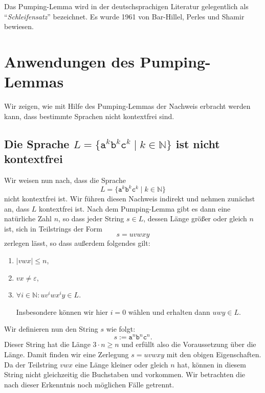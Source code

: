 \remark
Das Pumping-Lemma wird in der deutschsprachigen Literatur gelegentlich  als 
``\emph{Schleifensatz}'' bezeichnet.   Es wurde 1961 von Bar-Hillel, Perles und Shamir
\cite{barhillel:1961} bewiesen.

\section{Anwendungen des Pumping-Lemmas}
Wir zeigen, wie mit Hilfe des Pumping-Lemmas der Nachweis erbracht werden kann, dass
bestimmte Sprachen nicht kontextfrei sind.

\subsection{Die Sprache $L = \{ \mathtt{a}^k \mathtt{b}^k \mathtt{c}^k \mid k \in \mathbb{N} \}$ ist
nicht kontextfrei}
Wir weisen nun nach, dass die Sprache
\[ L = \{ \mathtt{a}^k \mathtt{b}^k \mathtt{c}^k \mid k \in \mathbb{N} \} \]
nicht kontextfrei ist.  Wir f\"uhren diesen Nachweis indirekt und nehmen zun\"achst an, dass $L$
kontextfrei ist.  Nach dem Pumping-Lemma gibt es dann eine nat\"urliche Zahl $n$, so dass jeder String
$s \in L$, dessen L\"ange gr\"o{\ss}er oder gleich $n$ ist, sich in Teilstrings der Form
\[ s = uvwxy \]
zerlegen l\"asst, so dass au{\ss}erdem folgendes gilt:
\begin{enumerate}
\item $|vwx| \leq n$,
\item $vx \not= \varepsilon$,
\item $\forall i \in \mathbb{N}: uv^iwx^iy \in L$.

      Insbesondere k\"onnen wir hier $i=0$ w\"ahlen und erhalten dann
      $uwy \in L$. 
\end{enumerate}
Wir definieren nun den String $s$ wie folgt:
\[ s := \mathtt{a}^n\mathtt{b}^n\mathtt{c}^n. \]
Dieser String hat die L\"ange $3 \cdot n \geq n$ und erf\"ullt also die Voraussetzung \"uber die L\"ange.
Damit finden wir eine Zerlegung $s=uvwxy$ mit den obigen Eigenschaften.  Da der Teilstring
$vwx$ eine L\"ange kleiner oder gleich $n$ hat, k\"onnen in diesem String nicht gleichzeitig die
Buchstaben  und  vorkommen. Wir betrachten die nach dieser Erkenntnis noch
m\"oglichen  F\"alle getrennt.

